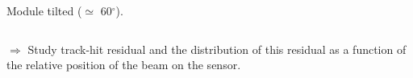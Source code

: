 \documentclass{beamer}
\newcommand{\grille}{
    \begin{tikzpicture}[overlay,remember picture]
        \begin{scope}[shift={(current page.south west)}]
            \draw[gray!50] (0,0) grid[step=2mm] (current page.north east);
            \draw[red!50] (0,0) grid[step=1cm] (current page.north east);
            \draw (0.2,1) node {1};
            \draw (0.2,2) node {2};
            \draw (0.2,3) node {3};
            \draw (0.2,4) node {4};
            \draw (0.2,5) node {5};
            \draw (0.2,6) node {6};
            \draw (0.2,7) node {7};
            \draw (0.2,8) node {8};
            \draw (0.2,9) node {9};
            \draw (1,0.5) node {1};
            \draw (2,0.5) node {2};
            \draw (3,0.5) node {3};
            \draw (4,0.5) node {4};
            \draw (5,0.5) node {5};
            \draw (6,0.5) node {6};
            \draw (7,0.5) node {7};
            \draw (8,0.5) node {8};
            \draw (9,0.5) node {9};
            \draw (10,0.5) node {10};
            \draw (11,0.5) node {11};
            \draw (12,0.5) node {12};
        \end{scope}
    \end{tikzpicture}
}
\newcommand{\degres}{\ensuremath{^\circ}}
\begin{document}
\begin{frame}
\begin{columns}[t]
\begin{column}{4cm}
\begin{center}
          \footnotesize{Module tilted ($\simeq$ 60\degres).}
        \end{center}
      \end{column}
    \end{columns}

    \vspace{0.1cm}
    \footnotesize{$\Rightarrow$ Study track-hit residual and the distribution of this residual as a function of the relative position of the beam on the sensor.

    \vspace{0.1cm}
    }
\end{frame}



\end{document}
